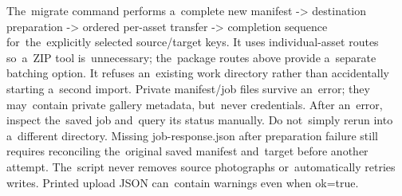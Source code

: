 \documentclass[11pt,a4paper]{article}
\begin{document}
The~migrate command performs a~complete new manifest -> destination preparation -> ordered
per-asset transfer -> completion sequence for~the~explicitly selected source/target keys. It
uses individual-asset routes so~a~ZIP tool is~unnecessary; the~package routes above provide
a~separate batching option. It refuses an~existing work directory rather than accidentally
starting a~second import. Private manifest/job files survive an~error; they may~contain
private gallery metadata, but~never credentials. After an~error, inspect the~saved job
and~query its status manually. Do not~simply rerun into a~different directory. Missing
job-response.json after preparation failure still requires reconciling the~original saved
manifest and~target before another attempt. The~script never removes source photographs
or~automatically retries writes. Printed upload JSON can~contain warnings even when ok=true.
\end{document}
